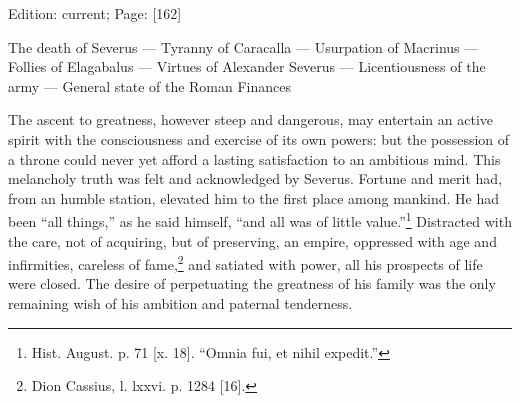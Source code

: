 Edition: current; Page: [162]


The death of Severus \texthebrew{—} Tyranny of Caracalla \texthebrew{—} Usurpation of Macrinus \texthebrew{—} Follies of Elagabalus \texthebrew{—} Virtues of Alexander Severus \texthebrew{—} Licentiousness of the army \texthebrew{—} General state of the Roman Finances

The ascent to greatness, however steep and dangerous, may entertain an active spirit with the consciousness and exercise of its own powers: but the possession of a throne could never yet afford a lasting satisfaction to an ambitious mind. This melancholy truth was felt and acknowledged by Severus. Fortune and merit had, from an humble station, elevated him to the first place among mankind. He had been \texthebrew{“}all things,\texthebrew{}” as he said himself, \texthebrew{“}and all was of little value.\texthebrew{}”\footnote{Hist. August. p. 71 [x. 18]. \texthebrew{“}Omnia fui, et nihil expedit.\texthebrew{}”} Distracted with the care, not of acquiring, but of preserving, an empire, oppressed with age and infirmities, careless of fame,\footnote{Dion Cassius, l. lxxvi. p. 1284 [16].} and satiated with power, all his prospects of life were closed. The desire of perpetuating the greatness of his family was the only remaining wish of his ambition and paternal tenderness.

